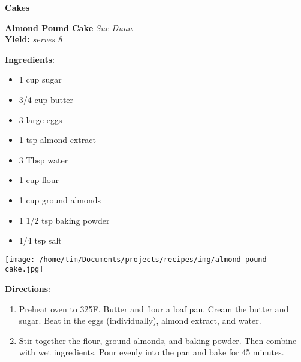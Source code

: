 \documentclass[11pt, twoside, openany]{book}
\begin{document}
{\newpage \LARGE \textbf{Cakes}} \label{cakes}\vspace{4mm}\\
\noindent\begin{minipage}[t]{\linewidth}%
{\Large\textbf{Almond Pound Cake}} \label{almond-pound-cake}\hfill\textit{Sue Dunn}\\
\textbf{Yield:} \textit{serves 8}\\
\noindent\begin{minipage}[t]{0.78\linewidth}%
\textbf{Ingredients}:\vspace{-3mm}
\begin{multicols}{2}
\begin{itemize}\setlength\itemsep{-1mm}
\item 1 cup sugar
\item 3/4 cup butter
\item 3 large eggs
\item 1 tsp almond extract
\item 3 Tbsp water
\item 1 cup flour
\item 1 cup ground almonds
\item 1 1/2 tsp baking powder
\item 1/4 tsp salt
\end{itemize}
\end{multicols}
\end{minipage}
\noindent\begin{minipage}[t]{0.18\linewidth}
\centering \strut\vspace*{-\baselineskip}\newline
\texttt{[image: /home/tim/Documents/projects/recipes/img/almond-pound-cake.jpg]}\\
\end{minipage}\vspace{3mm}
\textbf{Directions}:
\vspace{-3mm}\begin{enumerate}\setlength\itemsep{-1mm}
\item Preheat oven to 325F. Butter and flour a loaf pan. Cream the butter and sugar. Beat in the eggs (individually), almond extract, and water.
\item Stir together the flour, ground almonds, and baking powder. Then combine with wet ingredients. Pour evenly into the pan and bake for 45 minutes.
\end{enumerate}
\end{minipage}\vspace{8mm}
\end{document}
